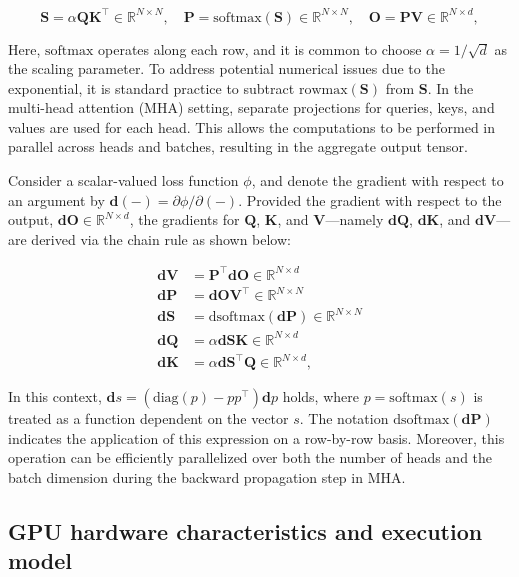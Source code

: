 \begin{equation*}
  \mathbf{S} = \alpha \mathbf{Q} \mathbf{K}^\top \in \mathbb{R}^{N \times N}, \quad \mathbf{P} = \mathrm{softmax}(\mathbf{S}) \in \mathbb{R}^{N \times N}, \quad \mathbf{O} = \mathbf{P}\mathbf{V} \in \mathbb{R}^{N \times d},
\end{equation*}

Here, $\mathrm{softmax}$ operates along each row, and it is common to choose $\alpha = 1/\sqrt{d}$ as the scaling parameter. To address potential numerical issues due to the exponential, it is standard practice to subtract $\mathrm{rowmax}(\mathbf{S})$ from $\mathbf{S}$. In the multi-head attention (MHA) setting, separate projections for queries, keys, and values are used for each head. This allows the computations to be performed in parallel across heads and batches, resulting in the aggregate output tensor.

Consider a scalar-valued loss function $\phi$, and denote the gradient with respect to an argument by $\mathbf{d}(-) = \partial \phi / \partial (-)$. Provided the gradient with respect to the output, $\mathbf{dO} \in \mathbb{R}^{N \times d}$, the gradients for $\mathbf{Q}$, $\mathbf{K}$, and $\mathbf{V}$—namely $\mathbf{dQ}$, $\mathbf{dK}$, and $\mathbf{dV}$—are derived via the chain rule as shown below:

\begin{align*}
  \mathbf{dV} &= \mathbf{P}^\top \mathbf{dO} \in \mathbb{R}^{N \times d} \\
  \mathbf{dP} &= \mathbf{dO} \mathbf{V}^\top \in \mathbb{R}^{N \times N} \\
  \mathbf{dS} &= \mathrm{dsoftmax} (\mathbf{dP}) \in \mathbb{R}^{N \times N} \\
  \mathbf{dQ} &= \alpha \mathbf{dS} \mathbf{K} \in \mathbb{R}^{N \times d} \\
  \mathbf{dK} &= \alpha \mathbf{dS}^\top \mathbf{Q} \in \mathbb{R}^{N \times d},
\end{align*}

In this context, $\mathbf{d}s = (\mathrm{diag}(p) - p p^\top)\mathbf{d}p$ holds, where $p = \mathrm{softmax}(s)$ is treated as a function dependent on the vector $s$. The notation $\mathrm{dsoftmax}(\mathbf{dP})$ indicates the application of this expression on a row-by-row basis. Moreover, this operation can be efficiently parallelized over both the number of heads and the batch dimension during the backward propagation step in MHA.

\subsection{GPU hardware characteristics and execution model}
\label{subsec:hardware}

